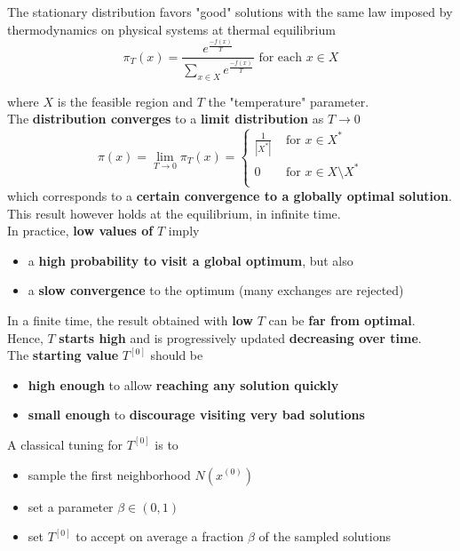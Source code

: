The stationary distribution favors "good" solutions with the same law imposed by thermodynamics on physical systems at thermal equilibrium
$$ \pi_T (x) = \frac{ e^{\frac{-f(x)}{T}} }{ \sum_{x \in X} e^{\frac{-f(x)}{T}} } \text{ for each } x \in X $$

where $X$ is the feasible region and $T$ the "temperature" parameter.\\

The \textbf{distribution converges} to a \textbf{limit distribution} as $T \rightarrow 0$
$$ \pi (x) = \lim_{T \rightarrow 0} \pi_T (x) = \begin{cases}
	\frac{1}{|X^\ast|} & \text{ for } x \in X^\ast \\
	0 & \text{ for } x \in X \setminus X^\ast\\
\end{cases}$$
which corresponds to a \textbf{certain convergence to a globally optimal solution}.\\

This result however holds at the equilibrium, in infinite time.\\

In practice, \textbf{low values of} $T$ imply
\begin{itemize}
	\item a \textbf{high probability to visit a global optimum}, but also
	\item a \textbf{slow convergence} to the optimum (many exchanges are rejected)
\end{itemize}

In a finite time, the result obtained with \textbf{low} $T$ can be \textbf{far from optimal}.\\
Hence, $T$ \textbf{starts high} and is progressively updated \textbf{decreasing over time}.\\

The \textbf{starting value} $T^{[0]}$ should be
\begin{itemize}
	\item \textbf{high enough} to allow \textbf{reaching any solution quickly}
	\item \textbf{small enough} to \textbf{discourage visiting very bad solutions}
\end{itemize}

A classical tuning for $T^{[0]}$ is to
\begin{itemize}
	\item sample the first neighborhood $N (x^{(0)})$
	\item set a parameter $\beta \in (0, 1)$
	\item set $T^{[0]}$ to accept on average a fraction $\beta$ of the sampled solutions
\end{itemize}

